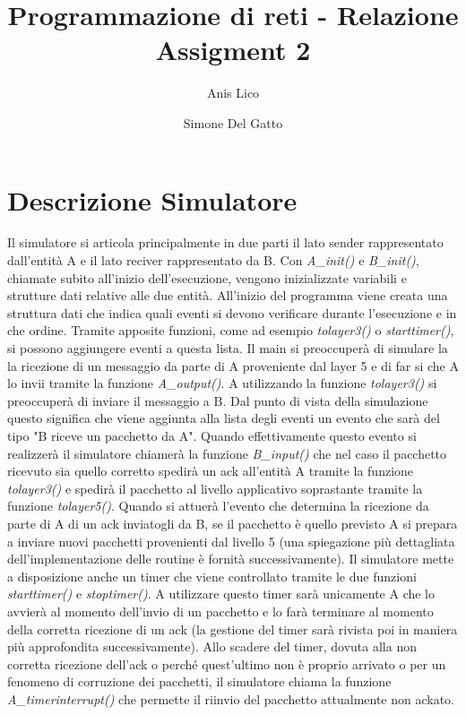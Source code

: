 \documentclass[a4paper]{article}
\author{Anis Lico \and Simone Del Gatto}
\title{Programmazione di reti - Relazione Assigment 2}
\begin{document}
\maketitle
\tableofcontents

\section{Descrizione Simulatore}
Il simulatore si articola principalmente in due parti il lato sender rappresentato dall'entità A  e il lato reciver rappresentato da B.
Con \emph{A\_init()} e \emph{B\_init()}, chiamate subito all'inizio dell'esecuzione, vengono inizializzate variabili e strutture dati relative alle due entità.
All'inizio del programma viene creata una struttura dati che indica quali eventi si devono verificare durante l'esecuzione e in che ordine. Tramite apposite funzioni, come ad esempio \emph{tolayer3()} o \emph{starttimer()}, si possono aggiungere eventi a questa lista. 
Il main si preoccuperà di simulare la la ricezione di un messaggio da parte di A proveniente dal layer 5 e di far si che A lo invii tramite la funzione \emph{A\_output()}. A utilizzando la funzione \emph{tolayer3()} si preoccuperà di inviare il messaggio a B. Dal punto di vista della simulazione questo significa che viene aggiunta alla lista degli eventi un evento che sarà del tipo "B riceve un pacchetto da A". Quando effettivamente questo evento si realizzerà il simulatore chiamerà la funzione \emph{B\_input()} che nel caso il pacchetto ricevuto sia quello corretto spedirà un ack all'entità A tramite la funzione \emph{tolayer3()} e spedirà il pacchetto al livello applicativo soprastante tramite la funzione \emph{tolayer5()}. Quando si attuerà l'evento che determina la ricezione da parte di A di un ack inviatogli da B, se il pacchetto è quello previsto A si prepara a inviare nuovi pacchetti provenienti dal livello 5 (una spiegazione più dettagliata dell'implementazione delle routine è fornità successivamente).
Il simulatore mette a disposizione anche un timer che viene controllato tramite le due funzioni \emph{starttimer()} e \emph{stoptimer()}. A utilizzare questo timer sarà unicamente A che lo avvierà al momento dell'invio di un pacchetto e lo farà terminare al momento della corretta ricezione di un ack (la gestione del timer sarà rivista poi in maniera più approfondita successivamente). Allo scadere del timer, dovuta alla non corretta ricezione dell'ack o perché quest'ultimo non è proprio arrivato o per un fenomeno di corruzione dei pacchetti, il simulatore chiama la funzione \emph{A\_timerinterrupt()} che permette il riinvio del pacchetto attualmente non ackato.
\end{document}
